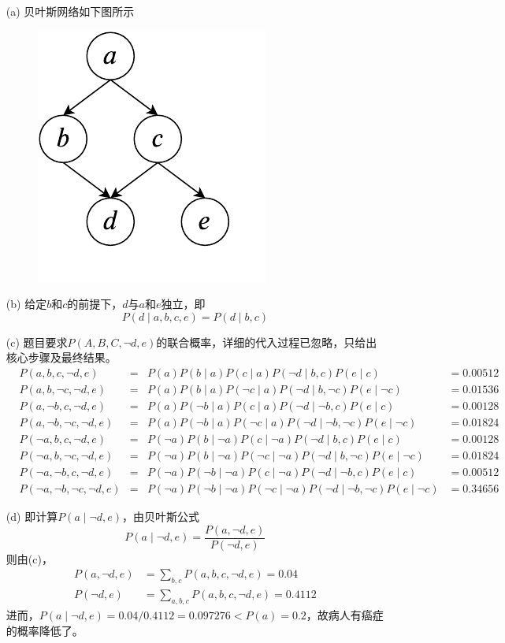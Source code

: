 \documentclass[a4paper, 11pt]{article}
\begin{document}
\begin{answer}
\begin{itemize}
    \item [(a)] 贝叶斯网络如下图所示
\begin{figure}[H]
\centering
\includegraphics[width=0.2\linewidth]{fig/T03-Q3-A.pdf}
\end{figure}
    \item [(b)] 给定$b$和$c$的前提下，$d$与$a$和$e$独立，即
    \[P(d\mid a,b,c,e)=P(d\mid b,c)\]
    \item [(c)] 题目要求$P(A,B,C,\lnot d,e)$的联合概率，详细的代入过程已忽略，只给出核心步骤及最终结果。
    \[\begin{aligned}
        &P(a,b,c,\lnot d,e) &=& P(a) P(b\mid a) P(c\mid a) P(\lnot d\mid b,c) P(e\mid c) &= 0.00512\\
        &P(a,b,\lnot c,\lnot d,e) &=& P(a) P(b\mid a) P(\lnot c\mid a) P(\lnot d\mid b,\lnot c) P(e\mid \lnot c) &= 0.01536\\
        &P(a,\lnot b,c,\lnot d,e) &=& P(a) P(\lnot b\mid a) P(c\mid a) P(\lnot d\mid \lnot b,c) P(e\mid c) &= 0.00128\\
        &P(a,\lnot b,\lnot c,\lnot d,e) &=& P(a) P(\lnot b\mid a) P(\lnot c\mid a) P(\lnot d\mid \lnot b,\lnot c) P(e\mid \lnot c) &= 0.01824\\
        &P(\lnot a,b,c,\lnot d,e) &=& P(\lnot a) P(b\mid \lnot a) P(c\mid \lnot a) P(\lnot d\mid b,c) P(e\mid c) &= 0.00128\\
        &P(\lnot a,b,\lnot c,\lnot d,e) &=& P(\lnot a) P(b\mid \lnot a) P(\lnot c\mid \lnot a) P(\lnot d\mid b,\lnot c) P(e\mid \lnot c) &= 0.01824\\
        &P(\lnot a,\lnot b,c,\lnot d,e) &=& P(\lnot a) P(\lnot b\mid \lnot a) P(c\mid \lnot a) P(\lnot d\mid \lnot b,c) P(e\mid c) &= 0.00512\\
        &P(\lnot a,\lnot b,\lnot c,\lnot d,e) &=& P(\lnot a) P(\lnot b\mid \lnot a) P(\lnot c\mid \lnot a) P(\lnot d\mid \lnot b,\lnot c) P(e\mid \lnot c) &= 0.34656
    \end{aligned}\]
    \item [(d)] 即计算$P(a\mid\lnot d,e)$，由贝叶斯公式
    \[P(a\mid\lnot d,e)=\frac{P(a,\lnot d,e)}{P(\lnot d,e)}\]
    则由(c)，
    \[\begin{aligned}
        P(a,\lnot d,e)&=\sum_{b,c} P(a,b,c,\lnot d,e)=0.04\\
        P(\lnot d,e)&=\sum_{a,b,c} P(a,b,c,\lnot d,e)=0.4112
    \end{aligned}\]
    进而，$P(a\mid\lnot d,e)=0.04/0.4112=0.097276<P(a)=0.2$，故病人有癌症的概率降低了。
\end{itemize}
\end{answer}
\end{document}
